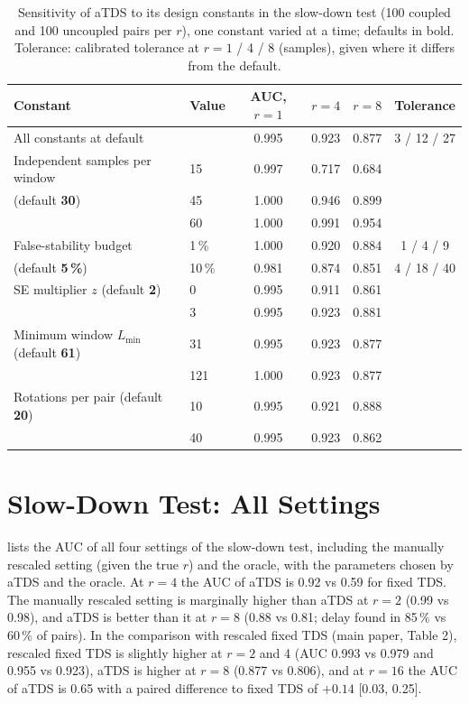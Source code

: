 \documentclass[11pt,a4paper]{article}
\begin{document}
\begin{table}[!htbp]
\centering
\caption{Sensitivity of aTDS to its design constants in the slow-down test (100 coupled and 100 uncoupled pairs per $r$), one constant varied at a time; defaults in bold. Tolerance: calibrated tolerance at $r = 1$ / 4 / 8 (samples), given where it differs from the default.}
\label{tab:sensitivity}
\footnotesize
\begin{tabular}{llcccc}
\toprule
Constant & Value & AUC, $r = 1$ & $r = 4$ & $r = 8$ & Tolerance \\
\midrule
All constants at default & & 0.995 & 0.923 & 0.877 & 3 / 12 / 27 \\
\midrule
Independent samples per window & 15 & 0.997 & 0.717 & 0.684 & \\
\quad (default \textbf{30}) & 45 & 1.000 & 0.946 & 0.899 & \\
 & 60 & 1.000 & 0.991 & 0.954 & \\
False-stability budget & 1\,\% & 1.000 & 0.920 & 0.884 & 1 / 4 / 9 \\
\quad (default \textbf{5\,\%}) & 10\,\% & 0.981 & 0.874 & 0.851 & 4 / 18 / 40 \\
SE multiplier $z$ (default \textbf{2}) & 0 & 0.995 & 0.911 & 0.861 & \\
 & 3 & 0.995 & 0.923 & 0.881 & \\
Minimum window $L_{\min}$ (default \textbf{61}) & 31 & 0.995 & 0.923 & 0.877 & \\
 & 121 & 1.000 & 0.923 & 0.877 & \\
Rotations per pair (default \textbf{20}) & 10 & 0.995 & 0.921 & 0.888 & \\
 & 40 & 0.995 & 0.923 & 0.862 & \\
\bottomrule
\end{tabular}
\end{table}

\section{Slow-Down Test: All Settings}
\label{app:slowdown}
 lists the AUC of all four settings of the slow-down test, including the manually rescaled setting (given the true $r$) and the oracle, with the parameters chosen by aTDS and the oracle. At $r = 4$ the AUC of aTDS is 0.92 vs 0.59 for fixed TDS. The manually rescaled setting is marginally higher than aTDS at $r = 2$ (0.99 vs 0.98), and aTDS is better than it at $r = 8$ (0.88 vs 0.81; delay found in 85\,\% vs 60\,\% of pairs). In the comparison with rescaled fixed TDS (main paper, Table 2), rescaled fixed TDS is slightly higher at $r = 2$ and 4 (AUC 0.993 vs 0.979 and 0.955 vs 0.923), aTDS is higher at $r = 8$ (0.877 vs 0.806), and at $r = 16$ the AUC of aTDS is 0.65 with a paired difference to fixed TDS of $+0.14$ [0.03, 0.25].
\end{document}
